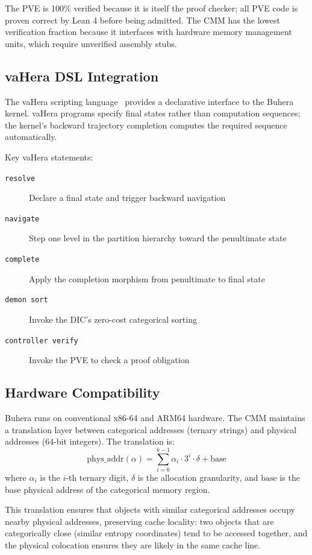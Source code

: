 \documentclass[12pt,twocolumn]{article}
\begin{document}
The PVE is 100\% verified because it is itself the proof checker; all PVE code is proven correct by Lean 4 before being admitted. The CMM has the lowest verification fraction because it interfaces with hardware memory management units, which require unverified assembly stubs.

\subsection{vaHera DSL Integration}

The vaHera scripting language~\cite{pierce2002types} provides a declarative interface to the Buhera kernel. vaHera programs specify final states rather than computation sequences; the kernel's backward trajectory completion computes the required sequence automatically.

Key vaHera statements:
\begin{description}
\item[\texttt{resolve}] Declare a final state and trigger backward navigation
\item[\texttt{navigate}] Step one level in the partition hierarchy toward the penultimate state
\item[\texttt{complete}] Apply the completion morphism from penultimate to final state
\item[\texttt{demon sort}] Invoke the DIC's zero-cost categorical sorting
\item[\texttt{controller verify}] Invoke the PVE to check a proof obligation
\end{description}

\subsection{Hardware Compatibility}

Buhera runs on conventional x86-64 and ARM64 hardware. The CMM maintains a translation layer between categorical addresses (ternary strings) and physical addresses (64-bit integers). The translation is:
\begin{equation}
\text{phys\_addr}(\alpha) = \sum_{i=0}^{k-1} \alpha_i \cdot 3^i \cdot \delta + \text{base}
\end{equation}
where $\alpha_i$ is the $i$-th ternary digit, $\delta$ is the allocation granularity, and $\text{base}$ is the base physical address of the categorical memory region.

This translation ensures that objects with similar categorical addresses occupy nearby physical addresses, preserving cache locality: two objects that are categorically close (similar entropy coordinates) tend to be accessed together, and the physical colocation ensures they are likely in the same cache line.
\end{document}
